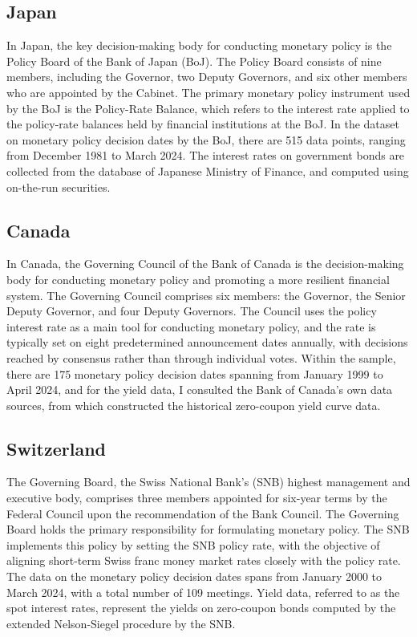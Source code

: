 \subsection{Japan}
In Japan, the key decision-making body for conducting monetary policy is the Policy Board of the Bank of Japan (BoJ). The Policy Board consists of nine members, including the Governor, two Deputy Governors, and six other members who are appointed by the Cabinet. The primary monetary policy instrument used by the BoJ is the Policy-Rate Balance, which refers to the interest rate applied to the policy-rate balances held by financial institutions at the BoJ. In the dataset on monetary policy decision dates by the BoJ, there are 515 data points, ranging from December 1981 to March 2024. The interest rates on government bonds are collected from the database of Japanese Ministry of Finance, and computed using on-the-run securities.


\subsection{Canada}

In Canada, the Governing Council of the Bank of Canada is the decision-making body for conducting monetary policy and promoting a more resilient financial system. The Governing Council comprises six members: the Governor, the Senior Deputy Governor, and four Deputy Governors. The Council uses the policy interest rate as a main tool for conducting monetary policy, and the rate is typically set on eight predetermined announcement dates annually, with decisions reached by consensus rather than through individual votes. Within the sample, there are 175 monetary policy decision dates spanning from January 1999 to April 2024, and for the yield data, I consulted the Bank of Canada's own data sources, from which \citet{bolder2004empirical} constructed the historical zero-coupon yield curve data.


\subsection{Switzerland}
The Governing Board, the Swiss National Bank's (SNB) highest management and executive body, comprises three members appointed for six-year terms by the Federal Council upon the recommendation of the Bank Council. The Governing Board holds the primary responsibility for formulating monetary policy. The SNB implements this policy by setting the SNB policy rate, with the objective of aligning short-term Swiss franc money market rates closely with the policy rate. The data on the monetary policy decision dates spans from January 2000 to March 2024, with a total number of 109 meetings. Yield data, referred to as the spot interest rates, represent the yields on zero-coupon bonds computed by the extended Nelson-Siegel procedure by the SNB.

